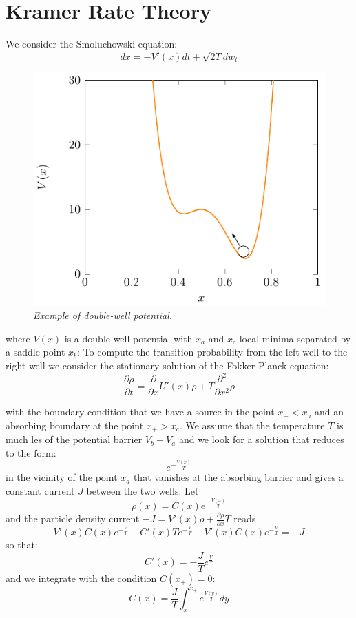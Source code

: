 \section{Kramer Rate Theory}
We consider the Smoluchowski equation:
\begin{equation}
dx = -V'(x)dt + \sqrt{2T} dw_t
\end{equation}

\begin{figure}
\centering
\includegraphics[scale=1.2]{images/kramerwell.pdf}
\caption{\emph{Example of double-well potential.}}
\label{fig:kr}
\end{figure}


where $V(x)$ is a double well potential with $x_a$ and $x_c$ local minima separated by a saddle point $x_b$: To compute the transition probability from the left well to the right well we consider the stationary solution of the Fokker-Planck equation:
\begin{equation}
\frac{\partial \rho}{\partial t } = \frac{\partial}{\partial x} U'(x)\rho + T \frac{\partial ^2 }{\partial x^2} \rho
\end{equation}

with the boundary condition that we have a source in the point $x_{-} < x_a$ and an absorbing boundary at the point $x_{+} > x_c$. We assume that the temperature $T$ is much les of the potential barrier $V_b - V_a$ and we look for a solution that reduces to the form:
$$
e^{-\frac{V(x)}{T}}
$$
in the vicinity of the point $x_a$ that vanishes at the absorbing barrier and gives a constant current $J$ between the two wells. Let
\begin{equation}
\rho(x)=C(x)e^{-\frac{V(x)}{T}}
\end{equation}
and the particle density current $-J=V'(x)\rho + \frac{\partial \rho}{\partial x}T$ reads
$$
V'(x)C(x)e^{-\frac{V}{T}} + C'(x)Te^{-\frac{V}{T}} - V'(x)C(x)e^{-\frac{V}{T}} = -J
$$
so that: 
$$
C'(x) = -\frac{J}{T}e^{\frac{V}{T}}
$$
and we integrate with the condition $C(x_{+}) = 0$:
$$
C(x) = \frac{J}{T}\int_{x}^{x_{+}} e^{\frac{V(y)}{T}}dy
$$

